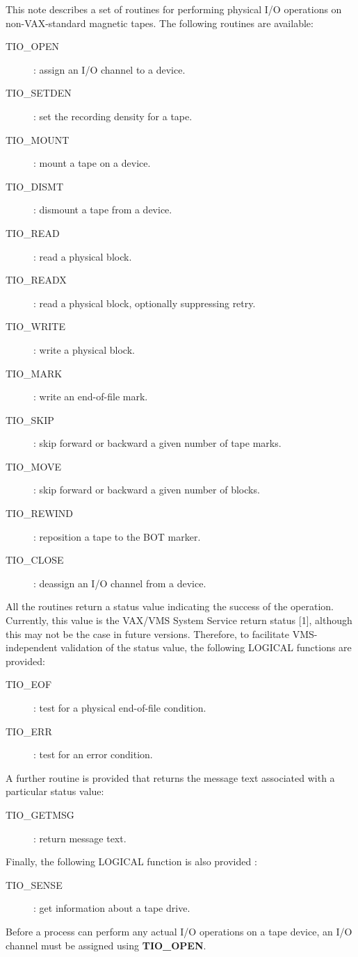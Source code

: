 This  note  describes  a  set  of  routines  for  performing  physical  I/O
operations on non-VAX-standard magnetic tapes.
The following routines are available:
\begin{description}
\item[TIO\_OPEN]: assign an I/O channel to a device.
\item[TIO\_SETDEN]: set the recording density for a tape.
\item[TIO\_MOUNT]: mount a tape on a device.
\item[TIO\_DISMT]: dismount a tape from a device.
\item[TIO\_READ]: read a physical block.
\item[TIO\_READX]: read a physical block, optionally suppressing retry.
\item[TIO\_WRITE]: write a physical block.
\item[TIO\_MARK]: write an end-of-file mark.
\item[TIO\_SKIP]: skip forward or backward a given number of tape marks.
\item[TIO\_MOVE]: skip forward or backward a given number of blocks.
\item[TIO\_REWIND]: reposition a tape to the BOT marker.
\item[TIO\_CLOSE]: deassign an I/O channel from a device.
\end{description}
All the routines return a status value indicating the success of the operation.
Currently, this value is the VAX/VMS System Service return status [1], although
this may not be the case in future versions.
Therefore, to facilitate VMS-independent validation of the status value, the
following LOGICAL functions are provided:
\begin{description}
\item[TIO\_EOF]: test for a physical end-of-file condition.
\item[TIO\_ERR]: test for an error condition.
\end{description}
A further routine is provided that returns the message text associated with a
particular status value:
\begin{description}
\item[TIO\_GETMSG]: return message text.
\end{description}
Finally, the following LOGICAL function is also provided :
\begin{description}
\item[TIO\_SENSE]: get information about a tape drive.
\end{description}
Before a process can perform any actual I/O operations on a tape device, an I/O
channel must be assigned using {\bf TIO\_OPEN}.

